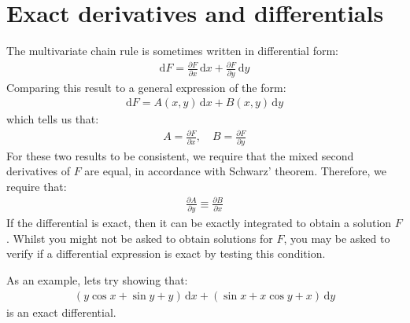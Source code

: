 \documentclass[letterpaper,10pt,english]{jupyterBook}
\begin{document}
\section{Exact derivatives and differentials}
\label{\detokenize{VectorCalculus/partialdifferentiation:exact-derivatives-and-differentials}}
\sphinxAtStartPar
The multivariate chain rule is sometimes written in differential form:
\begin{equation*}
\begin{split}\mathrm{d}F=\frac{\partial F}{\partial x}\,\mathrm{d}x+\frac{\partial F}{\partial y}\,\mathrm{d}y\end{split}
\end{equation*}
\sphinxAtStartPar
Comparing this result to a general expression of the form:
\begin{equation*}
\begin{split}\mathrm{d}F=A(x,y)\,\mathrm{d}x+B(x,y)\,\mathrm{d}y\end{split}
\end{equation*}
\sphinxAtStartPar
which tells us that:
\begin{equation*}
\begin{split}A = \frac{\partial F}{\partial x}, \quad B=\frac{\partial F}{\partial y}\end{split}
\end{equation*}
\sphinxAtStartPar
For these two results to be consistent, we require that the mixed second derivatives of \(F\) are equal, in accordance with Schwarz’ theorem.
Therefore, we require that:
\begin{equation*}
\begin{split}\frac{\partial A}{\partial y}\equiv\frac{\partial B}{\partial x}\end{split}
\end{equation*}
\sphinxAtStartPar
If the differential is exact, then it can be exactly integrated to obtain a solution \(F\). Whilst you might not be asked to obtain solutions for \(F\), you
may be asked to verify if a differential expression is exact by testing this condition.

\sphinxAtStartPar
As an example, lets try showing that:
\begin{equation*}
\begin{split}(y\cos{x}+\sin{y}+y)\,\mathrm{d}x + (\sin{x}+x\cos{y}+x)\,\mathrm{d}y\end{split}
\end{equation*}
\sphinxAtStartPar
is an exact differential.
\end{document}
